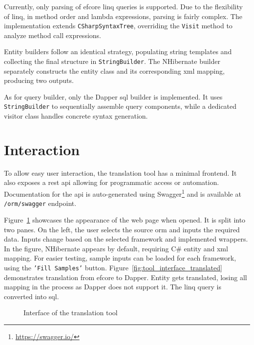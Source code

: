 Currently, only parsing of \acrshort{efcore} \acrshort{linq} queries is supported. Due to the flexibility of \acrshort{linq}, in method order and lambda expressions, parsing is fairly complex. The implementation extends \texttt{CSharpSyntaxTree}, overriding the \texttt{Visit} method to analyze method call expressions. 

Entity builders follow an identical strategy, populating string templates and collecting the final structure in \texttt{StringBuilder}. The NHibernate builder separately constructs the entity class and its corresponding \acrshort{xml} mapping, producing two outputs.

As for query builder, only the Dapper \acrshort{sql} builder is implemented. It uses \texttt{StringBuilder} to sequentially assemble query components, while a dedicated visitor class handles concrete syntax generation.


\section{Interaction}
To allow easy user interaction, the translation tool has a minimal frontend. It also exposes a \acrshort{rest} \acrshort{api} allowing for programmatic access or automation. Documentation for the \acrshort{api} is auto-generated using Swagger\footnote{\url{https://swagger.io/}} and is available at \texttt{/orm/swagger} endpoint.

Figure~\ref{fig:tool_interface} showcases the appearance of the web page when opened. It is split into two panes. On the left, the user selects the source \acrshort{orm} and inputs the required data. Inputs change based on the selected framework and implemented wrappers. In the figure, NHibernate appears by default, requiring C\# entity and \acrshort{xml} mapping. For easier testing, sample inputs can be loaded for each framework, using the \texttt{'Fill~Samples'} button. Figure~\ref{fig:tool_interface_translated} demonstrates translation from \acrshort{efcore} to Dapper. Entity gets translated, losing all mapping in the process as Dapper does not support it. The \acrshort{linq} query is converted into \acrshort{sql}.

\begin{figure}[!htp]
  \centering
  \caption{Interface of the translation tool}
  \label{fig:tool_interface}
\end{figure}

